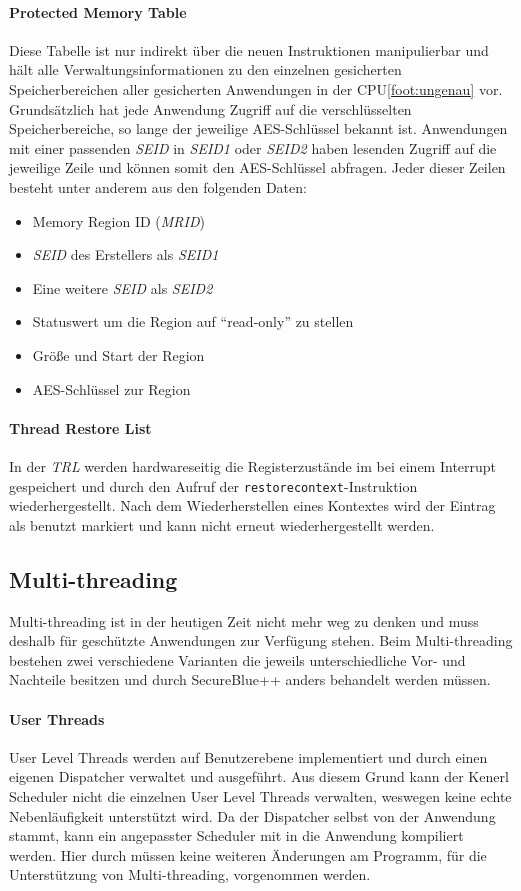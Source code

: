 \documentclass[ngerman]{sig-alternate-05-2015}
\begin{document}
\paragraph{Protected Memory Table}
Diese Tabelle ist nur indirekt über die neuen Instruktionen manipulierbar und hält alle Verwaltungsinformationen zu den einzelnen gesicherten Speicherbereichen aller gesicherten Anwendungen in der CPU\cref{foot:ungenau} vor. Grundsätzlich hat jede Anwendung Zugriff auf die verschlüsselten Speicherbereiche, so lange der jeweilige AES-Schlüssel bekannt ist. Anwendungen mit einer passenden \emph{SEID} in \emph{SEID1} oder \emph{SEID2} haben lesenden Zugriff auf die jeweilige Zeile und können somit den AES-Schlüssel abfragen. Jeder dieser Zeilen besteht unter anderem aus den folgenden Daten:
\begin{itemize}
	\item Memory Region ID (\emph{MRID})
	\item \emph{SEID} des Erstellers als \emph{SEID1}
	\item Eine weitere \emph{SEID} als \emph{SEID2}
	\item Statuswert um die Region auf \enquote{read-only} zu stellen
	\item Größe und Start der Region
	\item AES-Schlüssel zur Region
\end{itemize}

\paragraph{Thread Restore List}
In der \emph{TRL} werden hardwareseitig die Registerzustände im  bei einem Interrupt gespeichert und durch den Aufruf der \texttt{restorecontext}-Instruktion wiederhergestellt. Nach dem Wiederherstellen eines Kontextes wird der Eintrag als benutzt markiert und kann nicht erneut wiederhergestellt werden.

\subsection{Multi-threading}
\label{sec:multithreading}
Multi-threading ist in der heutigen Zeit nicht mehr weg zu denken und muss deshalb für geschützte Anwendungen zur Verfügung stehen. Beim Multi-threading bestehen zwei verschiedene Varianten die jeweils unterschiedliche Vor- und Nachteile besitzen und durch SecureBlue++ anders behandelt werden müssen.

\paragraph{User Threads}
User Level Threads werden auf Benutzerebene implementiert und durch einen eigenen Dispatcher verwaltet und ausgeführt. Aus diesem Grund kann der Kenerl Scheduler nicht die einzelnen User Level Threads verwalten, weswegen keine echte Nebenläufigkeit unterstützt wird. Da der Dispatcher selbst von der Anwendung stammt, kann ein angepasster Scheduler mit in die Anwendung kompiliert werden. Hier durch müssen keine weiteren Änderungen am Programm, für die Unterstützung von Multi-threading, vorgenommen werden. 
\end{document}
